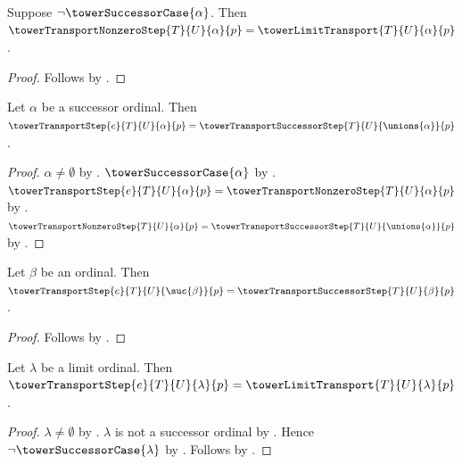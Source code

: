 \begin{proposition}\label{tower_transport_nonzero_step_limit}
    Suppose $\lnot\towerSuccessorCase{\alpha}$.
    Then $\towerTransportNonzeroStep{T}{U}{\alpha}{p}=
        \towerLimitTransport{T}{U}{\alpha}{p}$.
\end{proposition}
\begin{proof}
    Follows by
        .
\end{proof}

\begin{proposition}\label{tower_transport_step_successor_ordinal}
    Let $\alpha$ be a successor ordinal.
    Then $\towerTransportStep{e}{T}{U}{\alpha}{p}=
        \towerTransportSuccessorStep{T}{U}{\unions{\alpha}}{p}$.
\end{proposition}
\begin{proof}
    $\alpha\neq\emptyset$ by .
    $\towerSuccessorCase{\alpha}$ by
        .
    $\towerTransportStep{e}{T}{U}{\alpha}{p}=
        \towerTransportNonzeroStep{T}{U}{\alpha}{p}$ by
        .
    $\towerTransportNonzeroStep{T}{U}{\alpha}{p}=
        \towerTransportSuccessorStep{T}{U}{\unions{\alpha}}{p}$ by
        .
\end{proof}

\begin{corollary}\label{tower_transport_step_successor}
    Let $\beta$ be an ordinal.
    Then $\towerTransportStep{e}{T}{U}{\suc{\beta}}{p}=
        \towerTransportSuccessorStep{T}{U}{\beta}{p}$.
\end{corollary}
\begin{proof}
    Follows by
        .
\end{proof}

\begin{proposition}\label{tower_transport_step_limit}
    Let $\lambda$ be a limit ordinal.
    Then $\towerTransportStep{e}{T}{U}{\lambda}{p}=
        \towerLimitTransport{T}{U}{\lambda}{p}$.
\end{proposition}
\begin{proof}
    $\lambda\neq\emptyset$ by .
    $\lambda$ is not a successor ordinal by
        .
    Hence $\lnot\towerSuccessorCase{\lambda}$ by
        .
    Follows by
        .
\end{proof}

